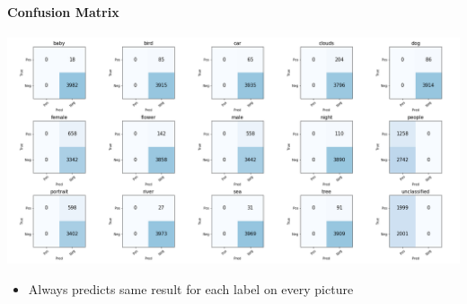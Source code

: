 \begin{frame}
	\frametitle{\overtitle}
	\framesubtitle{Confusion Matrix}
	\includegraphics[width=\textwidth]{images/final_model_confusion.png}
	\begin{itemize}
		\item Always predicts same result for each label on every picture
	\end{itemize}
\end{frame}


